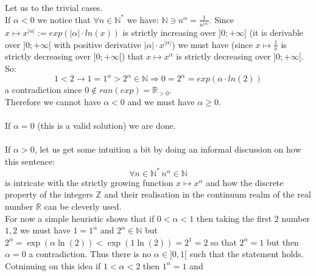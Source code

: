 \begin{solution}
    Let us to the trivial cases. \\
    If \( \alpha<0 \) we notice that \( \forall n\in\mathbb{N}^{*} \) we have: \( \mathbb{N}\ni n^{\alpha}=\frac{1}{n^{|\alpha|}} \). Since \( x\mapsto x^{|\alpha|}:=exp\left(|\alpha|\cdot ln\left(x\right)\right) \) is strictly increasing over \( ]0;+\infty[ \) (it is derivable over \( ]0;+\infty[ \) with positive derivative \( |\alpha|\cdot x^{|\alpha|} \)) we must have (since \( x\mapsto\frac{1}{x} \) is strictly decreasing over \( ]0;+\infty[ \)) that \( x\mapsto x^{\alpha} \) is strictly decreasing over \( ]0;+\infty[ \). So:
    \[
        1<2\rightarrow 1=1^{\alpha}>2^{\alpha}\in\mathbb{N}\Rightarrow 0=2^{\alpha}=exp\left(\alpha\cdot ln\left(2\right)\right)
    \]
    a contradiction since \( 0\notin ran\left(exp\right)=\mathbb{R}_{>0} \). \\
    Therefore we cannot have \( \alpha<0 \) and we must have \( \alpha\geq 0 \).
    \\\\
    If \( \alpha=0 \) (this is a valid solution) we are done.
    \\\\
    If \( \alpha>0 \), let us get some intuition a bit by doing an informal discussion on how this sentence:
    \[
        \forall n\in\mathbb{N}^{*}\, n^{\alpha}\in\mathbb{N}
    \]
    is intricate with the strictly growing function \( x\mapsto x^{\alpha} \) and how the discrete property of the integers \( \mathbb{Z} \) and their realisation in the continuum realm of the real number \( \mathbb{R} \) can be cleverly used. \\
    For now a simple heuristic shows that if \( 0<\alpha<1 \) then taking the first \( 2 \) number \( 1,2 \) we must have \( 1=1^{\alpha} \) and \( 2^\alpha\in\mathbb{N} \) but \( 2^\alpha=\exp\left(\alpha\ln\left(2\right)\right)<\exp\left(1\ln\left(2\right)\right)=2^1=2 \) so that \( 2^\alpha=1 \) but then \( \alpha=0 \) a contradiction. Thus there is no \( \alpha\in]0,1[ \) such that the statement holds. Cotninuing on this idea if \( 1<\alpha<2 \) then \( 1^{\alpha}=1 \) and
    \\\\

\end{solution}

